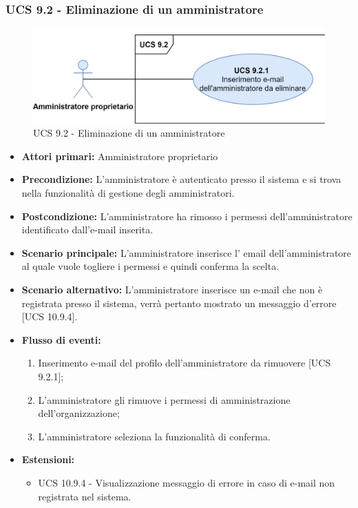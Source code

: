 \subsubsection{UCS 9.2 - Eliminazione di un amministratore}%

\begin{figure}[h]
  \centering
    \includegraphics[scale=1.0]{Sezioni/UseCase/Immagini/UCS9.2.png}
  \caption{UCS 9.2 - Eliminazione di un amministratore}
\end{figure}

\begin{itemize}
\item \textbf{Attori primari:} Amministratore proprietario
\item \textbf{Precondizione:} L'amministratore è autenticato presso il sistema e si trova nella funzionalità di gestione degli amministratori.
\item \textbf{Postcondizione:} L'amministratore ha rimosso i permessi dell'amministratore identificato dall'e-mail inserita.
\item \textbf{Scenario principale:} L'amministratore inserisce l' email dell'amministratore al quale vuole togliere i permessi e quindi conferma la scelta.
\item \textbf{Scenario alternativo:} L'amministratore inserisce un e-mail che non è registrata presso il sistema, verrà pertanto mostrato un messaggio d'errore [UCS 10.9.4].
\item \textbf{Flusso di eventi:} %
  \begin{enumerate}
        \item Inserimento e-mail del profilo dell'amministratore da rimuovere [UCS 9.2.1];
        \item L'amministratore gli rimuove i permessi di amministrazione dell'organizzazione;
        \item L'amministratore seleziona la funzionalità di conferma.
    \end{enumerate}
\item \textbf{Estensioni:}
	\begin{itemize}
		\item UCS 10.9.4 - Visualizzazione messaggio di errore in caso di e-mail non registrata nel sistema.
	\end{itemize}
\end{itemize}

